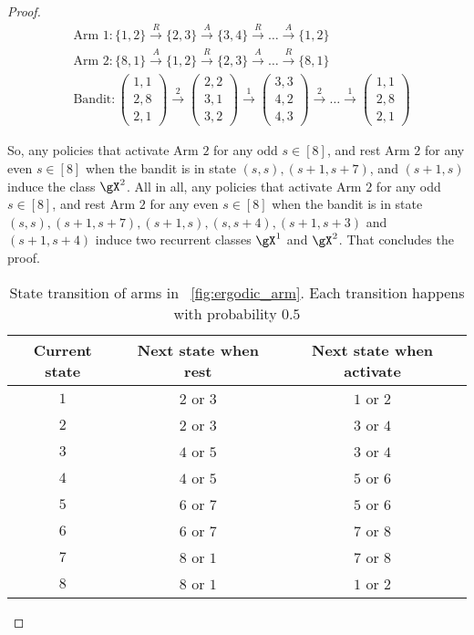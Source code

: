 \begin{proof}
    \begin{align*}
        &\text{Arm 1} : \{1,2\} \overset{R}{\to} \{2,3\} \overset{A}{\to} \{3,4\} \overset{R}{\to} \dots \overset{A}{\to} \{1,2\} \\
        &\text{Arm 2} : \{8,1\} \overset{A}{\to} \{1,2\} \overset{R}{\to} \{2,3\} \overset{A}{\to} \dots \overset{R}{\to} \{8,1\} \\
        &\text{Bandit} : \begin{pmatrix}1,1\\2,8\\2,1\end{pmatrix} \overset{2}{\to} \begin{pmatrix}2,2\\3,1\\3,2\end{pmatrix} \overset{1}{\to} \begin{pmatrix}3,3\\4,2\\4,3\end{pmatrix} \overset{2}{\to} \dots \overset{1}{\to} \begin{pmatrix}1,1\\2,8\\2,1\end{pmatrix}
    \end{align*}

    So, any policies that activate Arm $2$ for any odd $s\in[8]$, and rest Arm $2$ for any even $s\in[8]$ when the bandit is in state $(s,s), (s+1,s+7)$, and $(s+1,s)$ induce the class $\gX^2$.
    All in all, any policies that activate Arm $2$ for any odd $s\in[8]$, and rest Arm $2$ for any even $s\in[8]$ when the bandit is in state $(s,s), (s+1,s+7), (s+1,s), (s,s+4), (s+1,s+3)$ and $(s+1,s+4)$ induce two recurrent classes $\gX^1$ and $\gX^2$.
    That concludes the proof.
    \begin{table}[ht]
        \centering
        \begin{tabular}{|c|c|c|}
            \hline
            Current state & Next state when rest & Next state when activate \\\hline 
            $1$   & $2$ or $3$  &  $1$ or $2$ \\
            $2$   & $2$ or $3$  &  $3$ or $4$ \\
            $3$   & $4$ or $5$  &  $3$ or $4$ \\
            $4$   & $4$ or $5$  &  $5$ or $6$ \\
            $5$   & $6$ or $7$  &  $5$ or $6$ \\
            $6$   & $6$ or $7$  &  $7$ or $8$ \\
            $7$   & $8$ or $1$  &  $7$ or $8$ \\
            $8$   & $8$ or $1$  &  $1$ or $2$ \\ \hline
        \end{tabular}
        \caption{State transition of arms in \figurename~\ref{fig:ergodic_arm}. Each transition happens with probability $0.5$}
        \label{tab:ergodic_arm}
    \end{table}


\end{proof}
